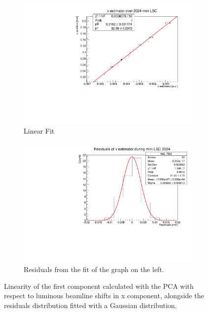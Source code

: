 \begin{figure}
    \centering
    \begin{subfigure}{0.48\textwidth}
    \includegraphics[width=\linewidth]{figures/x_res_new.pdf}
    \caption{Linear Fit}\label{fig:xfit_data}
    \end{subfigure}
    \begin{subfigure}{0.48\textwidth}
    \includegraphics[width=\linewidth]{figures/x_fit_new.pdf}
    \caption{Residuals from the fit of the graph on the left. }\label{fig:xres_data}
    \end{subfigure}
    \caption{Linearity of the first component calculated with the PCA with respect to luminous beamline shifts in x component, alongside the residuals distribution fitted with a Gaussian distribution.}
    \label{fig:x_data}
\end{figure}



